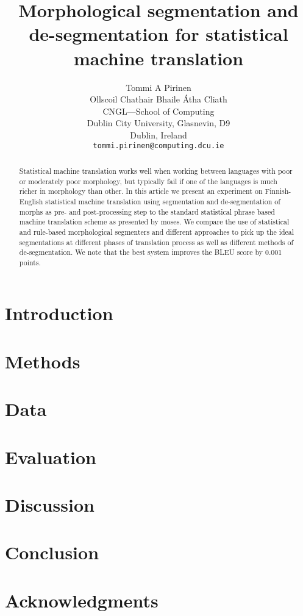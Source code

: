 \documentclass[11pt,letterpaper]{article}
\title{Morphological segmentation and de-segmentation for statistical machine
    translation\Thanks{This is an unpublished
authors draft}}}
\author{Tommi A Pirinen\\
    Ollscoil Chathair Bhaile Átha Cliath\\
    CNGL---School of Computing\\
    Dublin City University, Glasnevin, D9\\
    Dublin, Ireland\\
    {\tt tommi.pirinen@computing.dcu.ie}
}
\begin{document}
\maketitle
\begin{abstract}
    Statistical machine translation works well when working between languages
    with poor or moderately poor morphology, but typically fail if one
    of the languages is much richer in morphology than other. In this article
    we present an experiment on Finnish-English statistical machine translation
    using segmentation and de-segmentation of morphs as pre- and post-processing
    step to the standard statistical phrase based machine translation scheme
    as presented by moses. We compare the use of statistical and rule-based
    morphological segmenters and different approaches to pick up the
    ideal segmentations at different phases of translation process as well
    as different methods of de-segmentation. We note that the best system
    improves the BLEU score by 0.001 points.
\end{abstract}

\section{Introduction}
\label{sec:introduction}



\section{Methods}

\section{Data}

\section{Evaluation}

\section{Discussion}

\section{Conclusion}

\section*{Acknowledgments}




\end{document}
